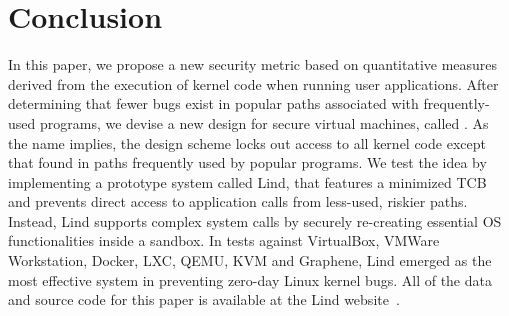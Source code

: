 \section{Conclusion}
\label{sec.conclusion}

In this paper, we propose a new security metric based on quantitative measures derived from
the execution of kernel code when running user applications.
After determining that fewer bugs exist in popular paths associated with frequently-used
programs, we devise a new design for secure virtual machines, called \lip.
As the name implies, the design scheme locks out access to all
kernel code except that found in paths frequently used by
popular programs. We test the \lip idea by implementing a prototype system
called Lind, that features a minimized TCB and prevents direct access to application
calls from less-used, riskier paths.
Instead, Lind supports complex system calls by securely re-creating
essential OS functionalities inside a sandbox.
In tests against VirtualBox, VMWare Workstation, Docker, LXC,
QEMU, KVM and Graphene, Lind emerged as the most effective system in preventing
zero-day Linux kernel bugs.
All of the data and source code for this paper is available at the Lind website~\cite{Lind}.
